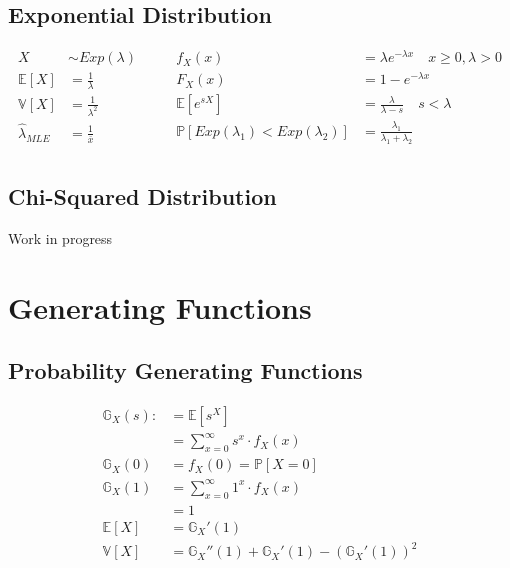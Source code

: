 \documentclass[12pt]{article}
\begin{document}
\subsection{Exponential Distribution}
\begin{equation*}
    \begin{aligned}
        X &\sim Exp(\lambda) \qquad\\
        \mathbb{E}[X] &= \frac{1}{\lambda} \\
        \mathbb{V}[X] &= \frac{1}{\lambda^2} \\
        \hat{\lambda}_{MLE} &= \frac{1}{\bar{x}} \\
    \end{aligned}
    \begin{aligned}
        f_X(x) &= \lambda e^{-\lambda x} \quad x \ge 0, \lambda > 0 \\
        F_X(x) &= 1 - e^{-\lambda x} \\
        \mathbb{E}[e^{sX}] &= \frac{\lambda}{\lambda - s} \quad s < \lambda \\
        \mathbb{P}[Exp(\lambda_1) < Exp(\lambda_2)] &= \frac{\lambda_1}{\lambda_1 + \lambda_2}\\
    \end{aligned}
\end{equation*}

\subsection{Chi-Squared Distribution}
Work in progress
\section{Generating Functions}
\subsection{Probability Generating Functions}
\begin{equation*}
    \begin{aligned}
        \mathbb{G}_X(s) :&= \mathbb{E}[s^X] \\
                         &= \sum_{x = 0}^\infty s^x \cdot f_X(x) \\
        \mathbb{G}_X(0)  &= f_X(0) = \mathbb{P}[X=0] \\
        \mathbb{G}_X(1)  &= \sum_{x = 0}^\infty 1^x \cdot f_X(x) \\
                         &= 1 \\
        \mathbb{E}[X] &= \mathbb{G}_X'(1)  \\
        \mathbb{V}[X] &= \mathbb{G}_X''(1) + \mathbb{G}_X'(1) - \left(\mathbb{G}_X'(1)\right)^2 \\
    \end{aligned}
\end{equation*}
\end{document}
